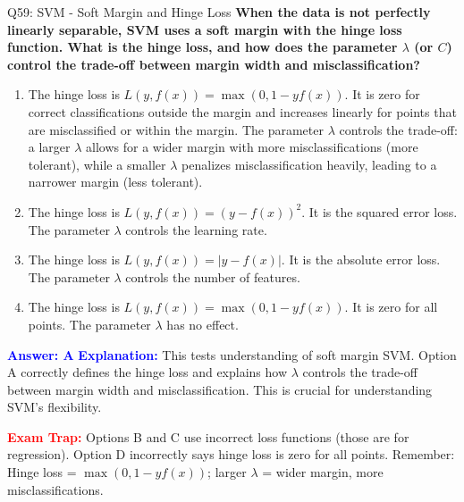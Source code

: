 \documentclass[8pt]{beamer}
\begin{document}
	\begin{frame}{Q59: SVM - Soft Margin and Hinge Loss}
		\fontsize{6.5}{7.5}\selectfont
		\textbf{When the data is not perfectly linearly separable, SVM uses a soft margin with the hinge loss function. What is the hinge loss, and how does the parameter $\lambda$ (or $C$) control the trade-off between margin width and misclassification?}
		
		\begin{enumerate}
			\item The hinge loss is $L(y, f(x)) = \max(0, 1 - y f(x))$. It is zero for correct classifications outside the margin and increases linearly for points that are misclassified or within the margin. The parameter $\lambda$ controls the trade-off: a larger $\lambda$ allows for a wider margin with more misclassifications (more tolerant), while a smaller $\lambda$ penalizes misclassification heavily, leading to a narrower margin (less tolerant).
			\item The hinge loss is $L(y, f(x)) = (y - f(x))^2$. It is the squared error loss. The parameter $\lambda$ controls the learning rate.
			\item The hinge loss is $L(y, f(x)) = |y - f(x)|$. It is the absolute error loss. The parameter $\lambda$ controls the number of features.
			\item The hinge loss is $L(y, f(x)) = \max(0, 1 - y f(x))$. It is zero for all points. The parameter $\lambda$ has no effect.
		\end{enumerate}
		
		\vspace{0.1cm}
		\textcolor{blue}{\textbf{Answer: A}}
		\vspace{0.1cm}
		\textcolor{blue}{\textbf{Explanation:}} This tests understanding of soft margin SVM. Option A correctly defines the hinge loss and explains how $\lambda$ controls the trade-off between margin width and misclassification. This is crucial for understanding SVM's flexibility.
		
		\textcolor{red}{\textbf{Exam Trap:}} Options B and C use incorrect loss functions (those are for regression). Option D incorrectly says hinge loss is zero for all points. Remember: Hinge loss = $\max(0, 1 - y f(x))$; larger $\lambda$ = wider margin, more misclassifications.
	\end{frame}
	
\end{document}
